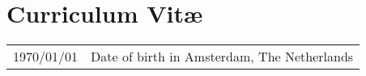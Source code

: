 \chapter*{Curriculum Vit\ae}

\makeatletter
\authors{\@firstname\ {\titleshape\@lastname}}
\makeatother

\noindent
\begin{longtable}{p{} p{}}
    1970/01/01 & Date of birth in Amsterdam, The Netherlands
\end{longtable}


